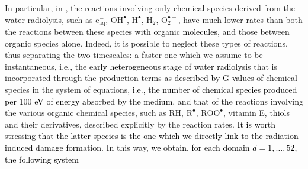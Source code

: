 \documentclass[10pt]{iopart}
\newcommand{\marco}[1]{\textcolor{black}{#1}}
\newcommand{\fra}[1]{\textcolor{black}{#1}}
\newcommand{\ema}[1]{\textcolor{black}{#1}}
\numberwithin{table}{section}
\begin{document}
In particular, in \cite{Labarbe2020}, the reactions involving only chemical species derived from the water radiolysis, such as $\mathrm{e^{-}_{aq}}$, $\mathrm{O\mathrm{H^{\bullet}}}$, $\mathrm{H^{\bullet}}$, $\mathrm{H_2}$, $\mathrm{O_2^{\bullet -}}$, have much lower rates than both the reactions between these species with organic \ema{molecules}, and those between organic species alone. Indeed, it is possible to neglect these types of reactions, thus separating the two timescales: a faster one which we assume to be instantaneous, i.e., the \ema{early heterogeneous stage of water radiolysis} that is incorporated through the production terms \fra{as described by G-values} of chemical species in the system of equations\marco{, i.e., the number of chemical species produced per 100 eV of energy absorbed by the medium}, and that of the reactions involving the various organic chemical species, such as $\mathrm{RH}$, $\mathrm{R^{\bullet}}$, $\mathrm{ROO^{\bullet}}$, vitamin E, thiols and their derivatives, described explicitly by the reaction rates. \fra{It is worth stressing that \ema{the latter} species is the one \ema{which we directly link} to the radiation-induced damage formation.} In this way, \fra{we obtain, for each domain $d = 1,\dots, 52$, the following \ema{system}}
\end{document}
